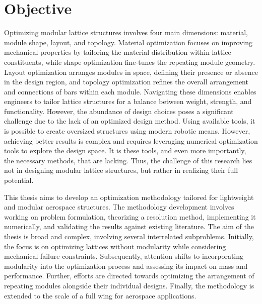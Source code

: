 \section*{Objective}
Optimizing modular lattice structures involves four main dimensions: material, module shape, layout, and topology. Material optimization focuses on improving mechanical properties by tailoring the material distribution within lattice constituents, while shape optimization fine-tunes the repeating module geometry. Layout optimization arranges modules in space, defining their presence or absence in the design region, and topology optimization refines the overall arrangement and connections of bars within each module. Navigating these dimensions enables engineers to tailor lattice structures for a balance between weight, strength, and functionality. However, the abundance of design choices poses a significant challenge due to the lack of an optimized design method. Using available tools, it is possible to create oversized structures using modern robotic means. However, achieving better results is complex and requires leveraging numerical optimization tools to explore the design space. It is these tools, and even more importantly, the necessary methods, that are lacking. Thus, the challenge of this research lies not in designing modular lattice structures, but rather in realizing their full potential.

This thesis aims to develop an optimization methodology tailored for lightweight and modular aerospace structures. The methodology development involves working on problem formulation, theorizing a resolution method, implementing it numerically, and validating the results against existing literature. The aim of the thesis is broad and complex, involving several interrelated subproblems. Initially, the focus is on optimizing lattices without modularity while considering mechanical failure constraints. Subsequently, attention shifts to incorporating modularity into the optimization process and assessing its impact on mass and performance. Further, efforts are directed towards optimizing the arrangement of repeating modules alongside their individual designs. Finally, the methodology is extended to the scale of a full wing for aerospace applications.


